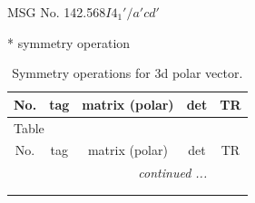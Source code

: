 \documentclass[fleqn,8pt]{jsarticle}
\begin{document}
\setcounter{MaxMatrixCols}{32}

\renewcommand{\tablename}{Table~}
\renewcommand{\figurename}{Figure~}
\begin{center}
\LARGE
MSG No. 142.568\quad$I4_{1}'/a'cd'$
\end{center}
* symmetry operation
\renewcommand{\arraystretch}{1.3}
\begin{longtable}{ccccc}
\caption{Symmetry operations for 3d polar vector.}
 \\
 \hline \hline
No. & tag & matrix (polar) & det & TR \\ \hline \endfirsthead

\multicolumn{4}{l}{\tablename\ \thetable{}} \\
 \hline \hline
No. & tag & matrix (polar) & det & TR \\ \hline \endhead

 \hline \hline
\multicolumn{4}{r}{\footnotesize\it continued ...} \\ \endfoot

 \hline \hline
\multicolumn{4}{r}{} \\ \endlastfoot


\end{longtable}
\end{document}
